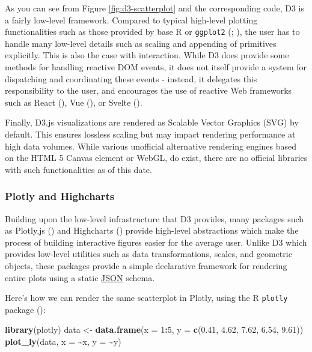 \documentclass[
]{book}
\newenvironment{Shaded}{\begin{snugshade}}{\end{snugshade}}
\newcommand{\AttributeTok}[1]{\textcolor[rgb]{0.13,0.29,0.53}{#1}}
\newcommand{\DecValTok}[1]{\textcolor[rgb]{0.00,0.00,0.81}{#1}}
\newcommand{\FloatTok}[1]{\textcolor[rgb]{0.00,0.00,0.81}{#1}}
\newcommand{\FunctionTok}[1]{\textcolor[rgb]{0.13,0.29,0.53}{\textbf{#1}}}
\newcommand{\NormalTok}[1]{#1}
\newcommand{\OtherTok}[1]{\textcolor[rgb]{0.56,0.35,0.01}{#1}}
\newcommand{\SpecialCharTok}[1]{\textcolor[rgb]{0.81,0.36,0.00}{\textbf{#1}}}
\theoremstyle{definition}
\theoremstyle{definition}
\theoremstyle{definition}
\theoremstyle{definition}
\theoremstyle{remark}
\begin{document}
As you can see from Figure \ref{fig:d3-scatterplot} and the corresponding code, D3 is a fairly low-level framework. Compared to typical high-level plotting functionalities such as those provided by base R or \texttt{ggplot2} (; ), the user has to handle many low-level details such as scaling and appending of primitives explicitly. This is also the case with interaction. While D3 does provide some methods for handling reactive DOM events, it does not itself provide a system for dispatching and coordinating these events - instead, it delegates this responsibility to the user, and encourages the use of reactive Web frameworks such as React (), Vue (), or Svelte ().

Finally, D3.js visualizations are rendered as Scalable Vector Graphics (SVG) by default. This ensures lossless scaling but may impact rendering performance at high data volumes. While various unofficial alternative rendering engines based on the HTML 5 Canvas element or WebGL, do exist, there are no official libraries with such functionalities as of this date.

\subsubsection{Plotly and Highcharts}\label{plotly-and-highcharts}

Building upon the low-level infrastructure that D3 provides, many packages such as Plotly.js () and Highcharts () provide high-level abstractions which make the process of building interactive figures easier for the average user. Unlike D3 which provides low-level utilities such as data transformations, scales, and geometric objects, these packages provide a simple declarative framework for rendering entire plots using a static \hyperref[JSON]{JSON} schema.

Here's how we can render the same scatterplot in Plotly, using the R \texttt{plotly} package ():

\begin{Shaded}
\begin{Highlighting}[]
\FunctionTok{library}\NormalTok{(plotly)}
\NormalTok{data }\OtherTok{\textless{}{-}} \FunctionTok{data.frame}\NormalTok{(}\AttributeTok{x =} \DecValTok{1}\SpecialCharTok{:}\DecValTok{5}\NormalTok{, }\AttributeTok{y =} \FunctionTok{c}\NormalTok{(}\FloatTok{0.41}\NormalTok{, }\FloatTok{4.62}\NormalTok{, }\FloatTok{7.62}\NormalTok{, }\FloatTok{6.54}\NormalTok{, }\FloatTok{9.61}\NormalTok{))}
\FunctionTok{plot\_ly}\NormalTok{(data, }\AttributeTok{x =} \SpecialCharTok{\textasciitilde{}}\NormalTok{x, }\AttributeTok{y =} \SpecialCharTok{\textasciitilde{}}\NormalTok{y)}
\end{Highlighting}
\end{Shaded}
\end{document}
